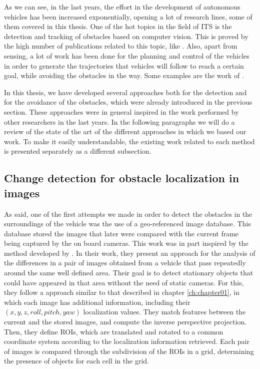 As we can see, in the last years, the effort in the development of autonomous vehicles has been increased exponentially, opening a lot of research lines, some of them covered in this thesis. One of the hot topics in the field of \ac{ITS} is the detection and tracking of obstacles based on computer vision. This is proved by the high number of publications related to this topic, like \cite{Broggi2006, Broggi2010, primdahl2005change, Scharstein2002, Morales2011, Geiger2012, Steingrube2009, Morales2012, Morales2009, badino2009stixel, gunyel2012stixels, danescu2012particle, broggi2013}.
Also, apart from sensing, a lot of work has been done for the planning and control of the vehicles in order to generate the trajectories that vehicles will follow to reach a certain goal, while avoiding the obstacles in the way. Some examples are the work of \cite{werling2010optimal, thrun2006stanley, chu2012local}.

In this thesis, we have developed several approaches both for the detection and for the avoidance of the obstacles, which were already introduced in the previous section. These approaches were in general inspired in the work performed by other researchers in the last years. In the following paragraphs we will do a review of the state of the art of the different approaches in which we based our work. To make it easily understandable, the existing work related to each method is presented separately as a different subsection.

\subsection{Change detection for obstacle localization in images}\label{ch:chapter00_02_01}

As said, one of the first attempts we made in order to detect the obstacles in the surroundings of the vehicle was the use of a geo-referenced image database. This database stored the images that later were compared with the current frame being captured by the on board cameras. This work was in part inspired by the method developed by \cite{primdahl2005change}. In their work, they present an approach for the analysis of the differences in a pair of images obtained from a vehicle that pass repeatedly around the same well defined area. Their goal is to detect stationary objects that could have appeared in that area without the need of static cameras. For this, they follow a approach similar to that described in chapter \ref{ch:chapter01}, in which each image has additional information, including their $(x, y, z, roll, pitch, yaw)$ localization values. They match features between the current and the stored images, and compute the inverse perspective projection. Then, they define \acp{ROI}, which are translated and rotated to a common coordinate system according to the localization information retrieved. Each pair of images is compared through the subdivision of the \acp{ROI} in a grid, determining the presence of objects for each cell in the grid.


